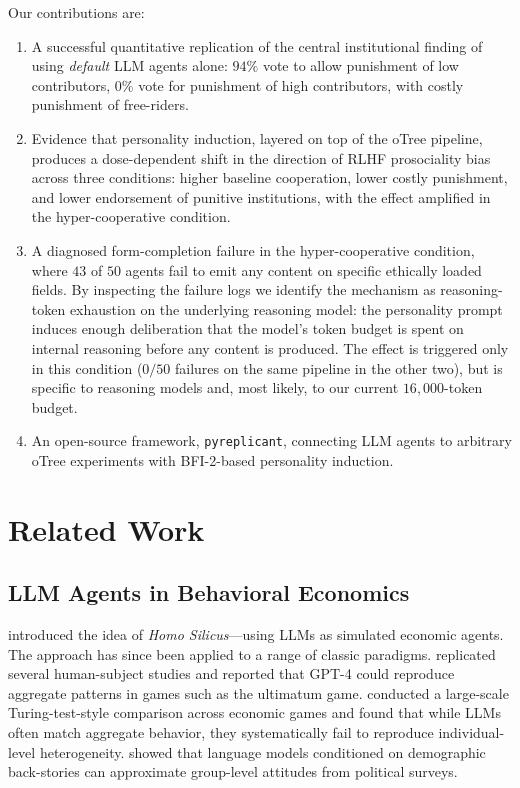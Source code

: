 \documentclass[12pt, a4paper]{article}
\begin{document}
Our contributions are:
\begin{enumerate}
  \item A successful quantitative replication of the central institutional finding of \citet{ertan2009who} using \emph{default} LLM agents alone: $94\%$ vote to allow punishment of low contributors, $0\%$ vote for punishment of high contributors, with costly punishment of free-riders.
  \item Evidence that personality induction, layered on top of the oTree pipeline, produces a dose-dependent shift in the direction of RLHF prosociality bias across three conditions: higher baseline cooperation, lower costly punishment, and lower endorsement of punitive institutions, with the effect amplified in the hyper-cooperative condition.
  \item A diagnosed form-completion failure in the hyper-cooperative condition, where $43$ of $50$ agents fail to emit any content on specific ethically loaded fields. By inspecting the failure logs we identify the mechanism as reasoning-token exhaustion on the underlying reasoning model: the personality prompt induces enough deliberation that the model's token budget is spent on internal reasoning before any content is produced. The effect is triggered only in this condition ($0/50$ failures on the same pipeline in the other two), but is specific to reasoning models and, most likely, to our current $16{,}000$-token budget.
  \item An open-source framework, \texttt{pyreplicant}, connecting LLM agents to arbitrary oTree experiments with BFI-2-based personality induction.
\end{enumerate}


\section{Related Work}

\subsection{LLM Agents in Behavioral Economics}

\citet{horton2023homo} introduced the idea of \emph{Homo Silicus}---using LLMs as simulated economic agents. The approach has since been applied to a range of classic paradigms. \citet{aher2023turing} replicated several human-subject studies and reported that GPT-4 could reproduce aggregate patterns in games such as the ultimatum game. \citet{mei2024turing} conducted a large-scale Turing-test-style comparison across economic games and found that while LLMs often match aggregate behavior, they systematically fail to reproduce individual-level heterogeneity. \citet{argyle2023out} showed that language models conditioned on demographic back-stories can approximate group-level attitudes from political surveys.
\end{document}
